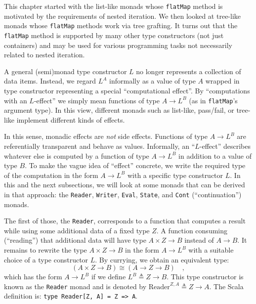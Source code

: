 This chapter started
with the list-like monads whose \lstinline!flatMap! method is motivated
by the requirements of nested iteration. We then looked at tree-like
monads whose \lstinline!flatMap! methods work via tree grafting.
It turns out that the \lstinline!flatMap! method is supported by
many other type constructors (not just containers) and may be used
for various programming tasks not necessarily related to nested iteration.

A general (semi)monad type constructor $L$ no longer represents a
collection of data items. Instead, we regard $L^{A}$ informally as
a value of type $A$ wrapped in type constructor representing a special
\textsf{``}computational effect\textsf{''}. By \textsf{``}computations with an $L$-effect\textsf{''}
we simply mean functions of type $A\rightarrow L^{B}$ (as in \lstinline!flatMap!\textsf{'}s
argument type). In this view, different monads \textemdash{} such
as list-like, pass/fail, or tree-like \textemdash{} implement different
kinds of effects.

In this sense, monadic effects are \emph{not} side effects.
Functions of type $A\rightarrow L^{B}$ are referentially transparent
and behave as values. Informally, an \textsf{``}$L$-effect\textsf{''}
describes whatever else is computed by a function of type $A\rightarrow L^{B}$
in addition to a value of type $B$. To make the vague idea of \textsf{``}effect\textsf{''}
concrete, we write the required type of the computation in the form
$A\rightarrow L^{B}$ with a specific type constructor $L$. In this
and the next subsections, we will look at some monads that can be
derived in that approach: the \lstinline!Reader!, \lstinline!Writer!,
\lstinline!Eval!, \lstinline!State!, and \lstinline!Cont! (\textsf{``}continuation\textsf{''})
monads.

The first of those, the \lstinline!Reader!, corresponds to a function
that computes a result while using some additional data of a fixed
type $Z$. A function consuming (\textsf{``}reading\textsf{''}) that additional data
will have type $A\times Z\rightarrow B$ instead of $A\rightarrow B$.
It remains to rewrite the type $A\times Z\rightarrow B$ in the form
$A\rightarrow L^{B}$ with a suitable choice of a type constructor
$L$. By currying, we obtain an equivalent type:
\[
(A\times Z\rightarrow B)\cong(A\rightarrow Z\rightarrow B)\quad,
\]
which has the form $A\rightarrow L^{B}$ if we define $L^{B}\triangleq Z\rightarrow B$.
This type constructor is known as the \lstinline!Reader! monad
and is denoted by $\text{Reader}^{Z,A}\triangleq Z\rightarrow A$.
The Scala definition is: \lstinline!type Reader[Z, A] = Z => A!.

